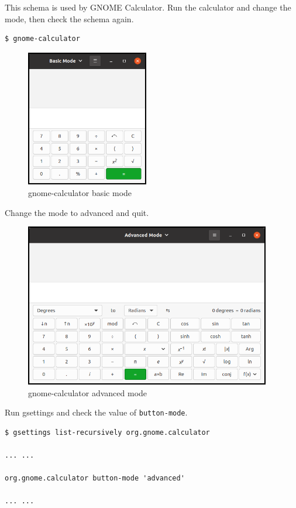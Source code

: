 This schema is used by GNOME Calculator. Run the calculator and change
the mode, then check the schema again.

\begin{lstlisting}
$ gnome-calculator
\end{lstlisting}

\begin{figure}
\centering
\includegraphics[width=5.34cm,height=5.97cm]{../image/gnome_calculator_basic.png}
\caption{gnome-calculator basic mode}
\end{figure}

Change the mode to advanced and quit.

\begin{figure}
\centering
\includegraphics[width=10.74cm,height=7.14cm]{../image/gnome_calculator_advanced.png}
\caption{gnome-calculator advanced mode}
\end{figure}

Run gsettings and check the value of
\passthrough{\lstinline!button-mode!}.

\begin{lstlisting}
$ gsettings list-recursively org.gnome.calculator

... ...

org.gnome.calculator button-mode 'advanced'

... ...
\end{lstlisting}

